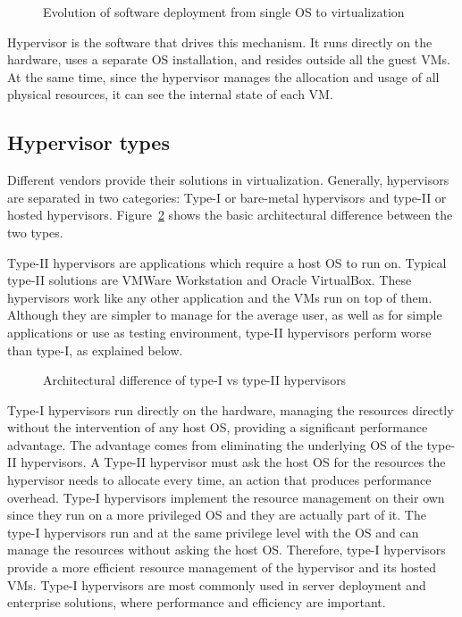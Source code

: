 \begin{figure}
	\centering
	
	\caption{Evolution of software deployment from single \ac{OS} to virtualization}
	\label{fig:tovirt}
\end{figure}

Hypervisor is the software that drives this mechanism. It runs directly on the hardware, uses a separate \ac{OS} installation, and resides outside all the guest \ac{VM}s. At the same time, since the hypervisor manages the allocation and usage of all physical resources, it can see the internal state of each \ac{VM}. 

\subsection{Hypervisor types}\label{sub:hyptypes}
Different vendors provide their solutions in virtualization. Generally, hypervisors are separated in two categories: Type-I or bare-metal hypervisors and type-II or hosted hypervisors. Figure~\ref{fig:hyptypes} shows the basic architectural difference between the two types.

\par Type-II hypervisors are applications which require a host \ac{OS} to run on. Typical type-II solutions are VMWare Workstation and Oracle VirtualBox. These hypervisors work like any other application and the \ac{VM}s run on top of them. Although they are simpler to manage for the average user, as well as for simple applications or use as testing environment, type-II hypervisors perform worse than type-I, as explained below. 

\begin{figure}
	\centering
	
	\caption{Architectural difference of type-I vs type-II hypervisors}
	\label{fig:hyptypes}
\end{figure}

\par Type-I hypervisors run directly on the hardware, managing the resources directly without the intervention of any host \ac{OS}, providing a significant performance advantage. The advantage comes from eliminating the underlying \ac{OS} of the type-II hypervisors. A Type-II hypervisor must ask the host \ac{OS} for the resources the hypervisor needs to allocate every time, an action that produces performance overhead. Type-I hypervisors implement the resource management on their own since they run on a more privileged \ac{OS} and they are actually part of it. The type-I hypervisors run and at the same privilege level with the \ac{OS} and can manage the resources without asking the host \ac{OS}. Therefore, type-I hypervisors provide a more efficient resource management of the hypervisor and its hosted \ac{VM}s. Type-I hypervisors are most commonly used in server deployment and enterprise solutions, where performance and efficiency are important. 

